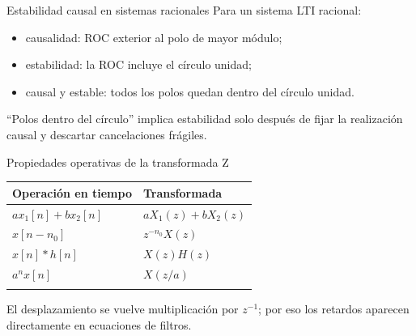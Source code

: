 \documentclass[
  ignorenonframetext,
  aspectratio=169,
  spanish,
  professionalfonts]{beamer}
\newcounter{none} %
\providecommand{\tightlist}{%
  \setlength{\itemsep}{0pt}\setlength{\parskip}{0pt}}
\begin{document}
\begin{frame}{Estabilidad causal en sistemas racionales}
\protect{}\label{estabilidad-causal-en-sistemas-racionales}
Para un sistema LTI racional:

\begin{itemize}
\tightlist
\item
  causalidad: ROC exterior al polo de mayor módulo;
\item
  estabilidad: la ROC incluye el círculo unidad;
\item
  causal y estable: todos los polos quedan dentro del círculo unidad.
\end{itemize}

\begin{tcolorbox}[enhanced jigsaw, arc=.35mm, bottomrule=.15mm, bottomtitle=1mm, breakable, colback=white, colbacktitle=quarto-callout-warning-color!10!white, colframe=quarto-callout-warning-color-frame, coltitle=black, left=2mm, leftrule=.75mm, opacityback=0, opacitybacktitle=0.6, rightrule=.15mm, title={Matiz}, titlerule=0mm, toprule=.15mm, toptitle=1mm]

``Polos dentro del círculo'' implica estabilidad solo después de fijar
la realización causal y descartar cancelaciones frágiles.

\end{tcolorbox}
\end{frame}

\begin{frame}{Propiedades operativas de la transformada Z}
\protect{}\label{propiedades-operativas-de-la-transformada-z}
{\def\LTcaptype{none} %
\begin{longtable}[]{@{}ll@{}}
\toprule\noalign{}
Operación en tiempo & Transformada \\
\midrule\noalign{}
\endhead
\(a x_1[n]+b x_2[n]\) & \(aX_1(z)+bX_2(z)\) \\
\(x[n-n_0]\) & \(z^{-n_0}X(z)\) \\
\(x[n]*h[n]\) & \(X(z)H(z)\) \\
\(a^n x[n]\) & \(X(z/a)\) \\
\bottomrule\noalign{}
\end{longtable}
}

\begin{tcolorbox}[enhanced jigsaw, arc=.35mm, bottomrule=.15mm, bottomtitle=1mm, breakable, colback=white, colbacktitle=quarto-callout-important-color!10!white, colframe=quarto-callout-important-color-frame, coltitle=black, left=2mm, leftrule=.75mm, opacityback=0, opacitybacktitle=0.6, rightrule=.15mm, title={Puente}, titlerule=0mm, toprule=.15mm, toptitle=1mm]

El desplazamiento se vuelve multiplicación por \(z^{-1}\); por eso los
retardos aparecen directamente en ecuaciones de filtros.

\end{tcolorbox}
\end{frame}
\end{document}
